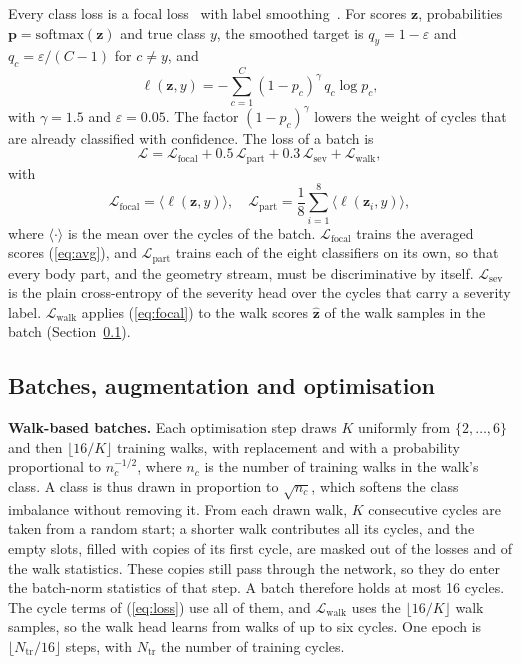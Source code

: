 \documentclass[conference]{IEEEtran}
\begin{document}
Every class loss is a focal loss~\cite{focal} with label smoothing~\cite{smoothing}. For scores $\mathbf{z}$, probabilities $\mathbf{p}=\mathrm{softmax}(\mathbf{z})$ and true class $y$, the smoothed target is $q_y=1-\varepsilon$ and $q_c=\varepsilon/(C-1)$ for $c\ne y$, and
\begin{equation}
\ell(\mathbf{z},y)=-\sum_{c=1}^{C}(1-p_c)^{\gamma}\,q_c\log p_c,
\label{eq:focal}
\end{equation}
with $\gamma=1.5$ and $\varepsilon=0.05$. The factor $(1-p_c)^{\gamma}$ lowers the weight of cycles that are already classified with confidence. The loss of a batch is
\begin{equation}
\mathcal{L}=\mathcal{L}_{\mathrm{focal}}+0.5\,\mathcal{L}_{\mathrm{part}}+0.3\,\mathcal{L}_{\mathrm{sev}}+\mathcal{L}_{\mathrm{walk}},
\label{eq:loss}
\end{equation}
with
\begin{equation}
\mathcal{L}_{\mathrm{focal}}=\langle\ell(\mathbf{z},y)\rangle,\quad \mathcal{L}_{\mathrm{part}}=\frac{1}{8}\sum_{i=1}^{8}\langle\ell(\mathbf{z}_i,y)\rangle,
\label{eq:parts}
\end{equation}
where $\langle\cdot\rangle$ is the mean over the cycles of the batch. $\mathcal{L}_{\mathrm{focal}}$ trains the averaged scores (\ref{eq:avg}), and $\mathcal{L}_{\mathrm{part}}$ trains each of the eight classifiers on its own, so that every body part, and the geometry stream, must be discriminative by itself. $\mathcal{L}_{\mathrm{sev}}$ is the plain cross-entropy of the severity head over the cycles that carry a severity label. $\mathcal{L}_{\mathrm{walk}}$ applies (\ref{eq:focal}) to the walk scores $\hat{\mathbf{z}}$ of the walk samples in the batch (Section~\ref{sec:batch}).

\subsection{Batches, augmentation and optimisation}
\label{sec:batch}

\textbf{Walk-based batches.} Each optimisation step draws $K$ uniformly from $\{2,\dots,6\}$ and then $\lfloor16/K\rfloor$ training walks, with replacement and with a probability proportional to $n_c^{-1/2}$, where $n_c$ is the number of training walks in the walk's class. A class is thus drawn in proportion to $\sqrt{n_c}$, which softens the class imbalance without removing it. From each drawn walk, $K$ consecutive cycles are taken from a random start; a shorter walk contributes all its cycles, and the empty slots, filled with copies of its first cycle, are masked out of the losses and of the walk statistics. These copies still pass through the network, so they do enter the batch-norm statistics of that step. A batch therefore holds at most 16 cycles. The cycle terms of (\ref{eq:loss}) use all of them, and $\mathcal{L}_{\mathrm{walk}}$ uses the $\lfloor16/K\rfloor$ walk samples, so the walk head learns from walks of up to six cycles. One epoch is $\lfloor N_{\mathrm{tr}}/16\rfloor$ steps, with $N_{\mathrm{tr}}$ the number of training cycles.
\end{document}
